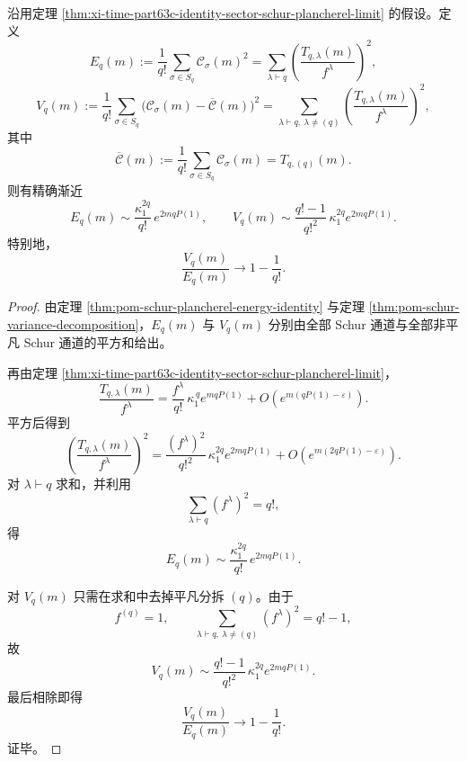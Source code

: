 \begin{corollary}\label{cor:xi-time-part63c-schur-plancherel-energy-variance-ratio}
沿用定理 \ref{thm:xi-time-part63c-identity-sector-schur-plancherel-limit} 的假设。定义
\[
E_q(m):=
\frac{1}{q!}\sum_{\sigma\in S_q}\mathcal C_\sigma(m)^2
=
\sum_{\lambda\vdash q}\left(\frac{T_{q,\lambda}(m)}{f^\lambda}\right)^2,
\]
\[
V_q(m):=
\frac{1}{q!}\sum_{\sigma\in S_q}\bigl(\mathcal C_\sigma(m)-\overline{\mathcal C}(m)\bigr)^2
=
\sum_{\lambda\vdash q,\ \lambda\neq(q)}\left(\frac{T_{q,\lambda}(m)}{f^\lambda}\right)^2,
\]
其中
\[
\overline{\mathcal C}(m):=\frac{1}{q!}\sum_{\sigma\in S_q}\mathcal C_\sigma(m)=T_{q,(q)}(m).
\]
则有精确渐近
\[
\boxed{\;
E_q(m)\sim \frac{\kappa_1^{2q}}{q!}\,e^{2mqP(1)},
\qquad
V_q(m)\sim \frac{q!-1}{q!^2}\,\kappa_1^{2q}e^{2mqP(1)}.\;}
\]
特别地，
\[
\boxed{\;
\frac{V_q(m)}{E_q(m)}\longrightarrow 1-\frac{1}{q!}.\;}
\]
\end{corollary}
\begin{proof}
由定理 \ref{thm:pom-schur-plancherel-energy-identity} 与定理 \ref{thm:pom-schur-variance-decomposition}，\(E_q(m)\) 与 \(V_q(m)\) 分别由全部 Schur 通道与全部非平凡 Schur 通道的平方和给出。

再由定理 \ref{thm:xi-time-part63c-identity-sector-schur-plancherel-limit}，
\[
\frac{T_{q,\lambda}(m)}{f^\lambda}
=
\frac{f^\lambda}{q!}\,\kappa_1^{\,q}e^{mqP(1)}
+O\!\left(e^{m(qP(1)-\varepsilon)}\right).
\]
平方后得到
\[
\left(\frac{T_{q,\lambda}(m)}{f^\lambda}\right)^2
=
\frac{(f^\lambda)^2}{q!^2}\,\kappa_1^{2q}e^{2mqP(1)}
+O\!\left(e^{m(2qP(1)-\varepsilon)}\right).
\]
对 \(\lambda\vdash q\) 求和，并利用
\[
\sum_{\lambda\vdash q}(f^\lambda)^2=q!,
\]
得
\[
E_q(m)\sim \frac{\kappa_1^{2q}}{q!}\,e^{2mqP(1)}.
\]

对 \(V_q(m)\) 只需在求和中去掉平凡分拆 \((q)\)。由于
\[
f^{(q)}=1,
\qquad
\sum_{\lambda\vdash q,\ \lambda\neq(q)}(f^\lambda)^2=q!-1,
\]
故
\[
V_q(m)\sim \frac{q!-1}{q!^2}\,\kappa_1^{2q}e^{2mqP(1)}.
\]
最后相除即得
\[
\frac{V_q(m)}{E_q(m)}\to 1-\frac{1}{q!}.
\]
证毕。
\end{proof}

